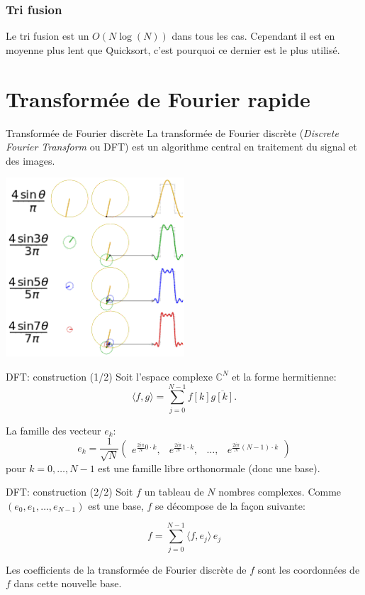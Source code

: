 \begin{frame}
 \frametitle{Tri fusion}
 Le tri fusion est un $O(N\log(N))$ dans tous les cas. Cependant il est en moyenne plus lent que Quicksort, c'est pourquoi ce dernier est le plus utilisé.
\end{frame}

\section{Transformée de Fourier rapide}

\begin{frame}{Transformée de Fourier discrète}
La transformée de Fourier discrète (\emph{Discrete Fourier Transform} ou DFT) est un algorithme central en traitement du signal et des images.

\centering
\includegraphics[width=0.5\textwidth]{images/fourier}

\end{frame}

\begin{frame}{DFT: construction (1/2)}
Soit l'espace complexe $\mathbb{C}^N$ et la forme hermitienne:
\[\langle f,g \rangle = \sum_{j=0}^{N-1}f[k]\overline{g[k]}.\]

La famille des vecteur $e_k$:
\[ e_k = \frac{1}{\sqrt{N}}\begin{pmatrix}
e^{\frac{2i\pi}{N} 0\cdot k}, & e^{\frac{2i\pi}{N} 1\cdot k}, & \dots, & e^{\frac{2i\pi}{N} (N-1)\cdot k}
\end{pmatrix}\]
pour $k=0, \ldots, N-1$ est une famille libre orthonormale (donc une base).
\end{frame}

\begin{frame}{DFT: construction (2/2)}
Soit $f$ un tableau de $N$ nombres complexes.
Comme $(e_0,e_1,\dots, e_{N-1})$ est une base, $f$ se décompose de la façon suivante:

\[f = \sum_{j=0}^{N-1} \langle f,e_j \rangle \, e_j\]

Les coefficients de la transformée de Fourier discrète de $f$ sont les coordonnées de $f$ dans cette nouvelle base.
\end{frame}


